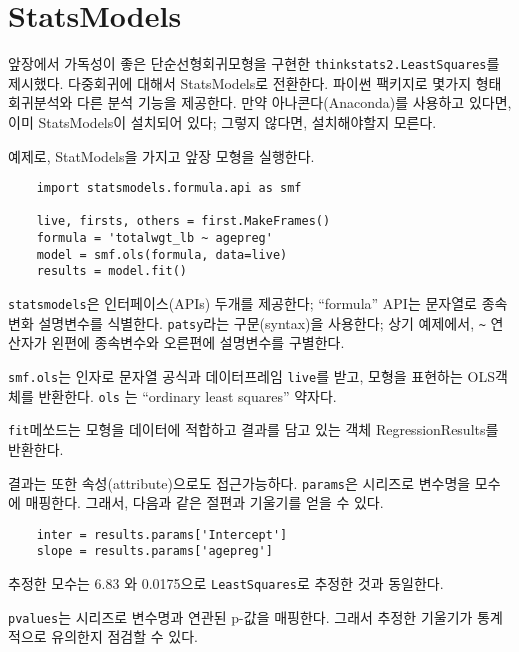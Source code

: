 \section{StatsModels}
\label{statsmodels}

앞장에서 가독성이 좋은 단순선형회귀모형을 구현한 {\tt thinkstats2.LeastSquares}를 제시했다. 다중회귀에 대해서 StatsModels로 전환한다. 파이썬 팩키지로 몇가지 형태 회귀분석와 다른 분석 기능을 제공한다. 만약 아나콘다(Anaconda)를 사용하고 있다면, 이미 StatsModels이 설치되어 있다; 그렇지 않다면, 설치해야할지 모른다.

예제로, StatModels을 가지고 앞장 모형을 실행한다.

\begin{verbatim}
    import statsmodels.formula.api as smf

    live, firsts, others = first.MakeFrames()
    formula = 'totalwgt_lb ~ agepreg'
    model = smf.ols(formula, data=live)
    results = model.fit()
\end{verbatim}

{\tt statsmodels}은 인터페이스(APIs) 두개를 제공한다; ``formula'' API는 문자열로 종속변화 설명변수를 식별한다.
{\tt patsy}라는 구문(syntax)을 사용한다; 상기 예제에서, \verb"~" 연산자가 왼편에 종속변수와 오른편에 설명변수를 구별한다.

{\tt smf.ols}는 인자로 문자열 공식과 데이터프레임 {\tt live}를 받고,
모형을 표현하는 OLS객체를 반환한다.
{\tt ols} 는 ``ordinary least squares'' 약자다.

{\tt fit}메쏘드는 모형을 데이터에 적합하고 결과를 담고 있는 객체 RegressionResults를 반환한다.

결과는 또한 속성(attribute)으로도 접근가능하다.
{\tt params}은 시리즈로 변수명을 모수에 매핑한다.
그래서, 다음과 같은 절편과 기울기를 얻을 수 있다.

\begin{verbatim}
    inter = results.params['Intercept']
    slope = results.params['agepreg']
\end{verbatim}

추정한 모수는 6.83 와 0.0175으로 {\tt LeastSquares}로 추정한 것과 동일한다.

{\tt pvalues}는 시리즈로 변수명과 연관된 p-값을 매핑한다.
그래서 추정한 기울기가 통계적으로 유의한지 점검할 수 있다.

